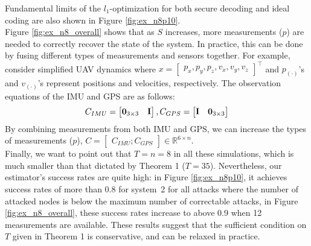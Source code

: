 \documentclass[twocolumn]{autart}    %
\newcommand{\rev}[1]{{\normalsize{{{\color{blue}#1}}}}}
\begin{document}
Fundamental limits of the $l_1$-optimization for both secure decoding and ideal coding are also shown in Figure \ref{fig:ex_n8p10}. 
\\
Figure \ref{fig:ex_n8_overall} shows that as $S$ increases, more measurements ($p$) are needed to correctly recover the state of the system. In practice, this can be done by fusing different types of measurements and sensors together. For example, consider simplified UAV dynamics where $ x = \begin{bmatrix} p_x, p_y, p_z, v_x, v_y, v_z \end{bmatrix}^\top$ and $p_{(\cdot)}$'s and $v_{(\cdot)}$'s represent positions and velocities, respectively. The observation equations of the IMU and GPS are as follows:
\begin{equation}
C_{IMU} =\begin{bmatrix} {\bf 0}_{3\times 3} & {\bf I} \end{bmatrix}, C_{GPS} = \begin{bmatrix} {\bf I} & {\bf 0}_{3\times 3} \end{bmatrix} \nonumber
\end{equation}
By combining measurements from both IMU and GPS, we can increase the types of measurements ($p$), $C = \begin{bmatrix} C_{IMU} ; C_{GPS}\end{bmatrix} \in \mathbb{R}^{6 \times n}$.
\\
Finally, we want to point out that $T=n=8$ in all these simulations, which is much smaller than that dictated by Theorem 1 ($T=35$).
Nevertheless, our \rev{estimator}'s success rates are quite high: in Figure \ref{fig:ex_n8p10}, it achieves success rates of more than 0.8 for system~2 for all attacks where the number of attacked nodes is below the maximum number of correctable \rev{attacks}, in Figure \ref{fig:ex_n8_overall}, these success rates increase to above 0.9 when 12 measurements are available. These results suggest that the sufficient condition on $T$ given in Theorem 1 is conservative, and can be relaxed in practice.
\vspace{-0.4cm}
\end{document}
